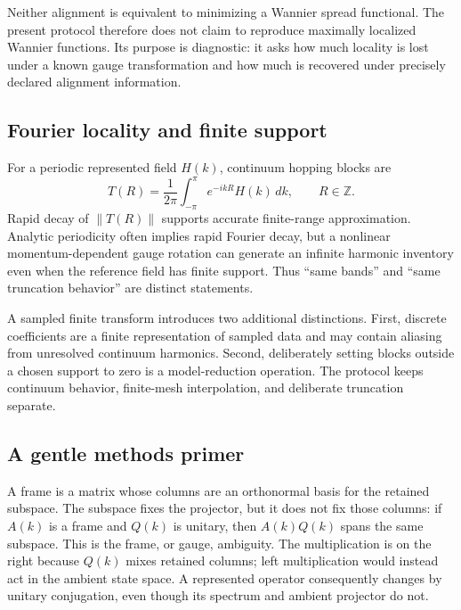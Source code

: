 \documentclass[11pt]{article}
\begin{document}
Neither alignment is equivalent to minimizing a Wannier spread functional. The present
protocol therefore does not claim to reproduce maximally localized Wannier functions.
Its purpose is diagnostic: it asks how much locality is lost under a known gauge transformation
and how much is recovered under precisely declared alignment information.

\subsection{Fourier locality and finite support}

For a periodic represented field $H(k)$, continuum hopping blocks are
\begin{equation}
 T(R)=\frac{1}{2\pi}\int_{-\pi}^{\pi}e^{-ikR}H(k)\,dk,
 \qquad R\in\mathbb Z.
 \label{eq:continuum-fourier}
\end{equation}
Rapid decay of $\|T(R)\|$ supports accurate finite-range approximation. Analytic
periodicity often implies rapid Fourier decay, but a nonlinear momentum-dependent gauge
rotation can generate an infinite harmonic inventory even when the reference field has
finite support. Thus ``same bands'' and ``same truncation behavior'' are distinct
statements.

A sampled finite transform introduces two additional distinctions. First, discrete
coefficients are a finite representation of sampled data and may contain aliasing from
unresolved continuum harmonics. Second, deliberately setting blocks outside a chosen
support to zero is a model-reduction operation. The protocol keeps continuum behavior,
finite-mesh interpolation, and deliberate truncation separate.

\subsection{A gentle methods primer}
\label{sec:methods-primer}

A frame is a matrix whose columns are an orthonormal basis for the retained subspace.
The subspace fixes the projector, but it does not fix those columns: if $A(k)$ is a frame
and $Q(k)$ is unitary, then $A(k)Q(k)$ spans the same subspace. This is the frame, or
gauge, ambiguity. The multiplication is on the right because $Q(k)$ mixes retained
columns; left multiplication would instead act in the ambient state space. A represented
operator consequently changes by unitary conjugation, even though its spectrum and
ambient projector do not.
\end{document}
